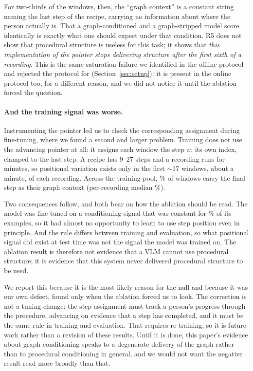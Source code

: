 \documentclass[10pt,twocolumn]{article}
\begin{document}
For two-thirds of the windows, then, the ``graph context'' is a constant string
naming the last step of the recipe, carrying no information about where the
person actually is. That a graph-conditioned and a graph-stripped model score
identically is exactly what one should expect under that condition. R5 does not
show that procedural structure is useless for this task; it shows that
\emph{this implementation of the pointer stops delivering structure after the
first sixth of a recording}. This is the same saturation failure we
identified in the offline protocol and rejected the protocol for
(Section~\ref{sec:setup}): it is present in the online protocol too, for a
different reason, and we did not notice it until the ablation forced the
question.

\paragraph{And the training signal was worse.} Instrumenting the pointer led us
to check the corresponding assignment during fine-tuning, where we found a
second and larger problem. Training does not use the advancing pointer at all:
it assigns each window the step at its own index, clamped to the last step. A
recipe has 9--27 steps and a recording runs for minutes, so positional variation
exists only in the first $\sim$17 windows, about a minute, of each
recording. Across the training pool, \satTrain{}\% of windows carry the final
step as their graph context (per-recording median \satTrainMed{}\%).

Two consequences follow, and both bear on how the ablation should be read. The
model was fine-tuned on a conditioning signal that was constant for
\satTrain{}\% of its examples, so it had almost no opportunity to learn to use
step position even in principle. And the rule differs between training and
evaluation, so what positional signal did exist at test time was not the signal
the model was trained on. The ablation result is therefore not evidence that a
VLM cannot use procedural structure; it is evidence that this system never
delivered procedural structure to be used.

We report this because it is the most likely reason for the null and because it
was our own defect, found only when the ablation forced us to look. The
correction is not a tuning change: the step assignment must track a person's
progress through the procedure, advancing on evidence that a step has
completed, and it must be the same rule in training and evaluation. That
requires re-training, so it is future work rather than a revision of these
results. Until it is done, this paper's evidence about graph conditioning speaks
to a degenerate delivery of the graph rather than to procedural conditioning in
general, and we would not want the negative result read more broadly than that.
\end{document}
